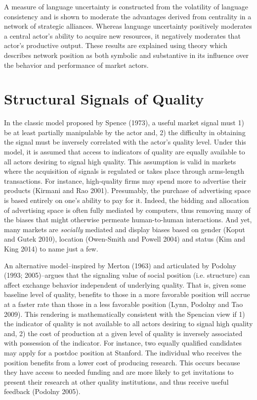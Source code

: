 A measure of language uncertainty is constructed from the volatility of language consistency and is shown to moderate the advantages derived from centrality in a network of strategic alliances. Whereas language uncertainty positively moderates a central actor's ability to acquire new resources, it negatively moderates that actor's productive output. These results are explained using theory which describes network position as both symbolic and substantive in its influence over the behavior and performance of market actors.

\section{Structural Signals of Quality \label{sig_qual}}

In the classic model proposed by Spence (1973), a useful market signal must 1) be at least partially manipulable by the actor and, 2) the difficulty in obtaining the signal must be inversely correlated with the actor's quality level. Under this model, it is assumed that access to indicators of quality are equally available to all actors desiring to signal high quality. This assumption is valid in markets where the acquisition of signals is regulated or takes place through arms-length transactions. For instance, high-quality firms may spend more to advertise their products (Kirmani and Rao 2001). Presumably, the purchase of advertising space is based entirely on one's ability to pay for it. Indeed, the bidding and allocation of advertising space is often fully mediated by computers, thus removing many of the biases that might otherwise permeate human-to-human interactions. And yet, many markets are \emph{socially} mediated and display biases based on gender (Koput and Gutek 2010), location (Owen-Smith and Powell 2004) and status (Kim and King 2014) to name just a few. 

An alternative model--inspired by Merton (1963) and articulated by Podolny (1993; 2005)--argues that the signaling value of social position (i.e. structure) can affect exchange behavior independent of underlying quality. That is, given some baseline level of quality, benefits to those in a more favorable position will accrue at a faster rate than those in a less favorable position (Lynn, Podolny and Tao 2009). This rendering is mathematically consistent with the Spencian view if 1) the indicator of quality is not available to all actors desiring to signal high quality and, 2) the cost of production at a given level of quality is inversely associated with possession of the indicator. For instance, two equally qualified candidates may apply for a postdoc position at Stanford. The individual who receives the position benefits from a lower cost of producing research. This occurs because they have access to needed funding and are more likely to get invitations to present their research at other quality institutions, and thus receive useful feedback (Podolny 2005).

